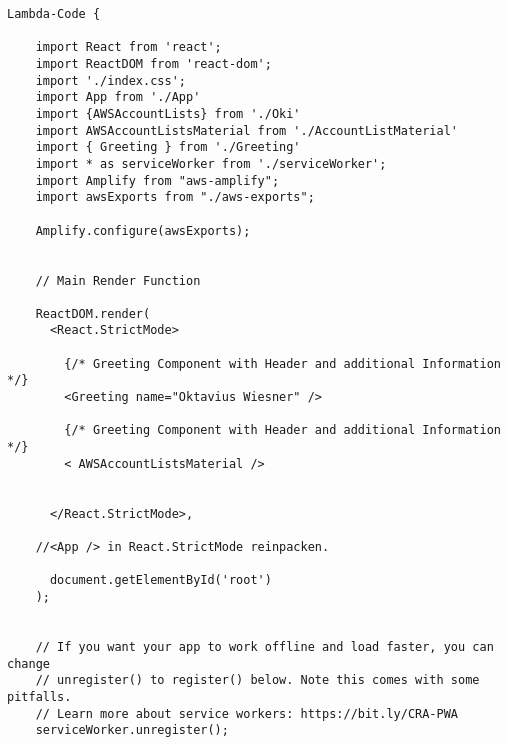 

\begin{lstlisting}[caption={React Main Render Funktion index.js },
label=lst:Beispielcode 1,basicstyle=\ttfamily\small ] Lambda-Code {

    import React from 'react';
    import ReactDOM from 'react-dom';
    import './index.css';
    import App from './App'
    import {AWSAccountLists} from './Oki'
    import AWSAccountListsMaterial from './AccountListMaterial'
    import { Greeting } from './Greeting'
    import * as serviceWorker from './serviceWorker';
    import Amplify from "aws-amplify";
    import awsExports from "./aws-exports";

    Amplify.configure(awsExports);


    // Main Render Function

    ReactDOM.render(
      <React.StrictMode>

        {/* Greeting Component with Header and additional Information */}
        <Greeting name="Oktavius Wiesner" />

        {/* Greeting Component with Header and additional Information */}
        < AWSAccountListsMaterial />


      </React.StrictMode>,

    //<App /> in React.StrictMode reinpacken.

      document.getElementById('root')
    );


    // If you want your app to work offline and load faster, you can change
    // unregister() to register() below. Note this comes with some pitfalls.
    // Learn more about service workers: https://bit.ly/CRA-PWA
    serviceWorker.unregister();

\end{lstlisting}
